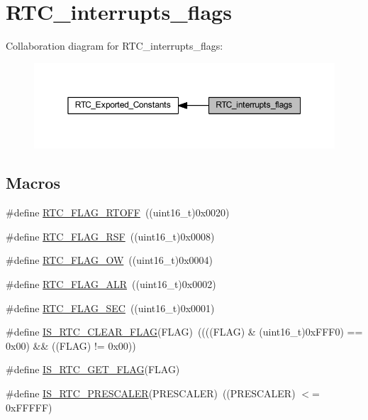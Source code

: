 \hypertarget{group___r_t_c__interrupts__flags}{}\section{R\+T\+C\+\_\+interrupts\+\_\+flags}
\label{group___r_t_c__interrupts__flags}
Collaboration diagram for R\+T\+C\+\_\+interrupts\+\_\+flags\+:
\nopagebreak
\begin{figure}[H]
\begin{center}
\leavevmode
\includegraphics[width=350pt]{group___r_t_c__interrupts__flags}
\end{center}
\end{figure}
\subsection*{Macros}
\begin{DoxyCompactItemize}
\item 
\#define \hyperlink{group___r_t_c__interrupts__flags_ga203dcbb991497e4d0e6722815f6db942}{R\+T\+C\+\_\+\+F\+L\+A\+G\+\_\+\+R\+T\+O\+FF}~((uint16\+\_\+t)0x0020)
\item 
\#define \hyperlink{group___r_t_c__interrupts__flags_ga78c4245996bef8d5f39226b6e37ed9c0}{R\+T\+C\+\_\+\+F\+L\+A\+G\+\_\+\+R\+SF}~((uint16\+\_\+t)0x0008)
\item 
\#define \hyperlink{group___r_t_c__interrupts__flags_ga4e321e359b914d7ed10eed985f8b4811}{R\+T\+C\+\_\+\+F\+L\+A\+G\+\_\+\+OW}~((uint16\+\_\+t)0x0004)
\item 
\#define \hyperlink{group___r_t_c__interrupts__flags_gaed4375a7ea5a147f83c6cf4bfa805caf}{R\+T\+C\+\_\+\+F\+L\+A\+G\+\_\+\+A\+LR}~((uint16\+\_\+t)0x0002)
\item 
\#define \hyperlink{group___r_t_c__interrupts__flags_ga8babb2c823c2097bf4a4ef0c20ef7367}{R\+T\+C\+\_\+\+F\+L\+A\+G\+\_\+\+S\+EC}~((uint16\+\_\+t)0x0001)
\item 
\#define \hyperlink{group___r_t_c__interrupts__flags_ga5f8a9327a258f16f29703fa3e3cc8af7}{I\+S\+\_\+\+R\+T\+C\+\_\+\+C\+L\+E\+A\+R\+\_\+\+F\+L\+AG}(F\+L\+AG)~((((F\+L\+AG) \& (uint16\+\_\+t)0x\+F\+F\+F0) == 0x00) \&\& ((\+F\+L\+A\+G) != 0x00))
\item 
\#define \hyperlink{group___r_t_c__interrupts__flags_ga2126725a0d48f1c40f42566e249620ef}{I\+S\+\_\+\+R\+T\+C\+\_\+\+G\+E\+T\+\_\+\+F\+L\+AG}(F\+L\+AG)
\item 
\#define \hyperlink{group___r_t_c__interrupts__flags_ga483b9ec67246cbfb2874c5a85f0cb4d8}{I\+S\+\_\+\+R\+T\+C\+\_\+\+P\+R\+E\+S\+C\+A\+L\+ER}(P\+R\+E\+S\+C\+A\+L\+ER)~((P\+R\+E\+S\+C\+A\+L\+ER) $<$= 0x\+F\+F\+F\+F\+F)
\end{DoxyCompactItemize}


